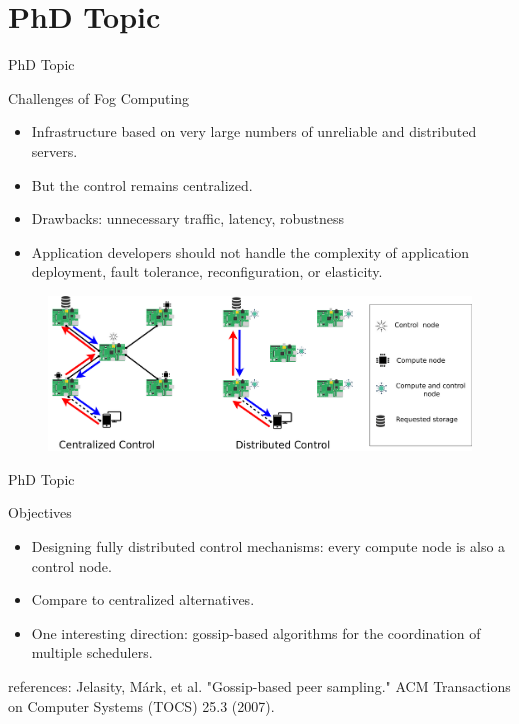 \documentclass{beamer}
\begin{document}
\section{PhD Topic}
\begin{frame}{PhD Topic}
 \begin{block}{Challenges of Fog Computing}
    \begin{itemize}
    \item Infrastructure based on very large numbers of unreliable and distributed servers.
    \item<2-> But the control remains centralized.
    \item<3-> Drawbacks: unnecessary traffic, latency, robustness
    \item<4-> Application developers should not handle the complexity of application deployment, fault tolerance, reconfiguration, or elasticity.
      
    \end{itemize}
    
    \end{block}
    
    \begin{figure}[ht]


 \includegraphics[width=.85\linewidth]{fog.png}
\end{figure}
\end{frame}

\begin{frame}{PhD Topic}


\begin{block}{Objectives}
    \begin{itemize}
    
    \item Designing fully distributed control mechanisms: every compute node is also a control node. 
    \item<2->  Compare to centralized alternatives. 
    \item<3->  One interesting direction: gossip-based algorithms for the coordination of multiple schedulers.
      
    \end{itemize}
    
    \end{block}
 {\tiny *references: Jelasity, Márk, et al. "Gossip-based peer sampling." ACM Transactions on Computer Systems (TOCS) 25.3 (2007).}    
    
 \end{frame}
    
\end{document}
